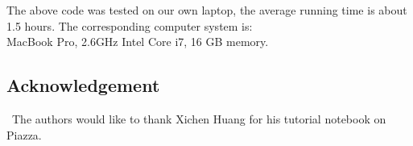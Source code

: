 \documentclass[12pt]{article}
\begin{document}
The above code was tested on our own laptop, the average running time is about 1.5 hours. The corresponding computer system is:\\
MacBook Pro, 2.6GHz Intel Core i7, 16 GB memory.  

\subsection*{Acknowledgement}


\quad\ The authors would like to thank Xichen Huang for his tutorial notebook on Piazza.

\vfill\pagebreak

%
\end{document}
